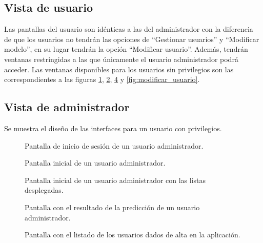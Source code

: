 \subsection{Vista de usuario}
Las pantallas del usuario son idénticas a las del administrador con la diferencia de que los usuarios no tendrán las opciones de ``Gestionar usuarios'' y ``Modificar modelo'', en su lugar tendrán la opción ``Modificar usuario''. Además, tendrán ventanas restringidas a las que únicamente el usuario administrador podrá acceder. Las ventanas disponibles para los usuarios sin privilegios son las correspondientes a las figuras \ref{fig:inicio_de_sesion}, \ref{fig:inicio}, \ref{fig:resultado} y \ref{fig:modificar_usuario}.

\subsection{Vista de administrador}
Se muestra el diseño de las interfaces para un usuario con privilegios.
\begin{figure}[h]
	\caption{Pantalla de inicio de sesión de un usuario administrador.}
	\label{fig:inicio_de_sesion}
\end{figure}

\begin{figure}[h]
	\caption{Pantalla inicial de un usuario administrador.}
	\label{fig:inicio}
\end{figure}

\begin{figure}[h]
	\caption{Pantalla inicial de un usuario administrador con las listas desplegadas.}
	\label{fig:inicio_1}
\end{figure}

\begin{figure}[h]
	\caption{Pantalla con el resultado de la predicción de un usuario administrador.}
	\label{fig:resultado}
\end{figure}

\begin{figure}[h]
	\caption{Pantalla con el listado de los usuarios dados de alta en la aplicación.}
	\label{fig:gestionar_usuarios}
\end{figure}

